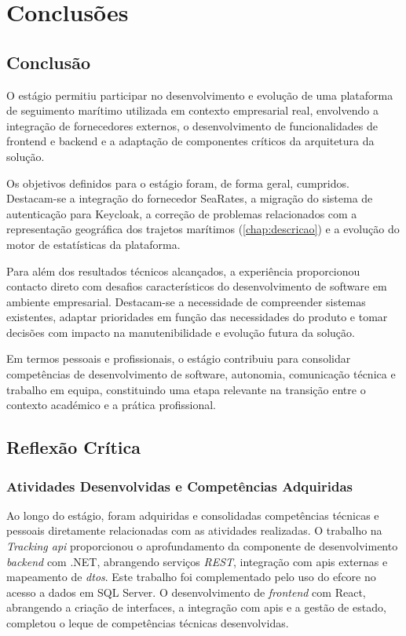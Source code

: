 ﻿%
\chapter{Conclusões}\label{chap:conclusoes}

\section{Conclusão}

O estágio permitiu participar no desenvolvimento e evolução de uma plataforma de seguimento marítimo utilizada em contexto empresarial real, envolvendo a integração de fornecedores externos, o desenvolvimento de funcionalidades de frontend e backend e a adaptação de componentes críticos da arquitetura da solução.

Os objetivos definidos para o estágio foram, de forma geral, cumpridos. Destacam-se a integração do fornecedor SeaRates, a migração do sistema de autenticação para Keycloak, a correção de problemas relacionados com a representação geográfica dos trajetos marítimos (\autoref{chap:descricao}) e a evolução do motor de estatísticas da plataforma.

Para além dos resultados técnicos alcançados, a experiência proporcionou contacto direto com desafios característicos do desenvolvimento de software em ambiente empresarial. Destacam-se a necessidade de compreender sistemas existentes, adaptar prioridades em função das necessidades do produto e tomar decisões com impacto na manutenibilidade e evolução futura da solução.

Em termos pessoais e profissionais, o estágio contribuiu para consolidar competências de desenvolvimento de software, autonomia, comunicação técnica e trabalho em equipa, constituindo uma etapa relevante na transição entre o contexto académico e a prática profissional.

\section{Reflexão Crítica}

\subsection{Atividades Desenvolvidas e Competências Adquiridas}

Ao longo do estágio, foram adquiridas e consolidadas competências técnicas e pessoais diretamente relacionadas com as atividades realizadas. O trabalho na \textit{Tracking \gls{api}} proporcionou o aprofundamento da componente de desenvolvimento \textit{backend} com .NET, abrangendo serviços \textit{REST}, integração com \glspl{api} externas e mapeamento de \textit{\glspl{dto}}. Este trabalho foi complementado pelo uso do \gls{efcore} no acesso a dados em SQL Server. O desenvolvimento de \textit{frontend} com React, abrangendo a criação de interfaces, a integração com \glspl{api} e a gestão de estado, completou o leque de competências técnicas desenvolvidas.

